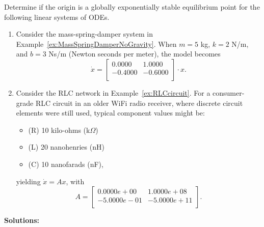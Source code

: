 \begin{example} Determine if the origin is a globally exponentially stable equilibrium point for the following linear systems of ODEs.

 \begin{enumerate}
\renewcommand{\labelenumi}{(\alph{enumi})}
\setlength{\itemsep}{.2cm}

\item Consider the mass-spring-damper system in Example~\ref{ex:MassSpringDamperNoGravity}. When $m = 5$ kg, $k = 2$ N/m, and $b = 3$ Ns/m (Newton seconds per meter), the model becomes
$$\dot{x} = \left[
\begin{array}{rr}
0.0000 & 1.0000 \\
-0.4000 & -0.6000 \\
\end{array}
\right] \cdot x.$$


\item Consider the RLC network in Example~\ref{ex:RLCcircuit}. For a consumer-grade RLC circuit in an older WiFi radio receiver, where discrete circuit elements were still used, typical component values might be:
\begin{itemize}
    \item (R) 10 kilo-ohms (k$\Omega$)
    \item (L) 20 nanohenries (nH)
    \item (C) 10 nanofarads (nF),
\end{itemize}
yielding $\dot{x} = A x$, with 
$$A=\left[
\begin{array}{rr}
0.0000e+00 & 1.0000e+08 \\
-5.0000e-01 & -5.0000e+11 \\
\end{array}
\right].$$ 
\end{enumerate}
\end{example}
\textbf{Solutions:}
